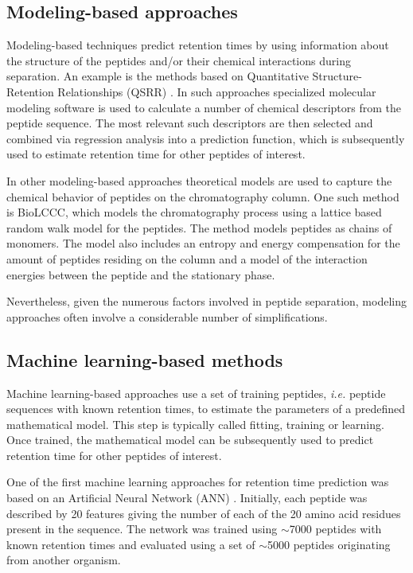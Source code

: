 \documentclass[a4paper]{article}
\begin{document}
\subsection{Modeling-based approaches}

Modeling-based techniques predict retention times by using information
about the structure of the peptides and/or their chemical interactions
during separation. An example is the methods based on Quantitative
Structure-Retention Relationships (QSRR) \cite{Kaliszan2005,
Baczek2005}. In such approaches specialized molecular modeling
software is used to calculate a number of chemical descriptors from
the peptide sequence. The most relevant such descriptors are then
selected and combined via regression analysis into a prediction
function, which is subsequently used to estimate retention time for
other peptides of interest.

In other modeling-based approaches theoretical models are used to
capture the chemical behavior of peptides on the chromatography
column. One such method is BioLCCC, which models the chromatography
process using a lattice based random walk model for the peptides. The
method models peptides as chains of monomers. The model also includes
an entropy and energy compensation for the amount of peptides residing
on the column and a model of the interaction energies between the
peptide and the stationary phase.

Nevertheless, given the numerous factors involved in peptide
separation, modeling approaches often involve a considerable number of
simplifications.
 
\subsection{Machine learning-based methods}
\label{sec:ML}

Machine learning-based approaches use a set of training peptides, {\em
  i.e.} peptide sequences with known retention times, to estimate the
parameters of a predefined mathematical model. This step is typically
called fitting, training or learning. Once trained, the mathematical
model can be subsequently used to predict retention time for other
peptides of interest.


One of the first machine learning approaches for retention time
prediction was based on an Artificial Neural Network
(ANN) \cite{petritis2003}. Initially, each peptide was described by 20
features giving the number of each of the 20 amino acid residues
present in the sequence. The network was trained using $\sim$7000
peptides with known retention times and evaluated using a set of
$\sim$5000 peptides originating from another organism. 
\end{document}
